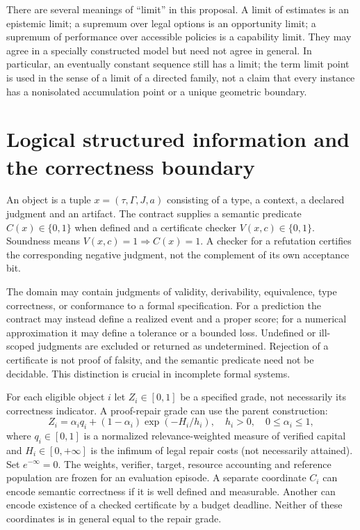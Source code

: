 \documentclass[11pt]{article}
\begin{document}
There are several meanings of ``limit'' in this proposal. A limit of estimates is an epistemic limit; a supremum over legal options is an opportunity limit; a supremum of performance over accessible policies is a capability limit. They may agree in a specially constructed model but need not agree in general. In particular, an eventually constant sequence still has a limit; the term limit point is used in the sense of a limit of a directed family, not a claim that every instance has a nonisolated accumulation point or a unique geometric boundary.

\section{Logical structured information and the correctness boundary}
\begin{definition}
An object is a tuple $x=(\tau,\Gamma,J,a)$ consisting of a type, a context, a declared judgment and an artifact. The contract supplies a semantic predicate $C(x)\in\{0,1\}$ when defined and a certificate checker $V(x,c)\in\{0,1\}$. Soundness means $V(x,c)=1\Rightarrow C(x)=1$. A checker for a refutation certifies the corresponding negative judgment, not the complement of its own acceptance bit.
\end{definition}
The domain may contain judgments of validity, derivability, equivalence, type correctness, or conformance to a formal specification. For a prediction the contract may instead define a realized event and a proper score; for a numerical approximation it may define a tolerance or a bounded loss. Undefined or ill-scoped judgments are excluded or returned as undetermined. Rejection of a certificate is not proof of falsity, and the semantic predicate need not be decidable. This distinction is crucial in incomplete formal systems.

For each eligible object $i$ let $Z_i\in[0,1]$ be a specified grade, not necessarily its correctness indicator. A proof-repair grade can use the parent construction:
\begin{equation} Z_i=\alpha_i q_i+(1-\alpha_i)\exp(-H_i/h_i),\quad h_i>0,\quad 0\leq\alpha_i\leq1,\end{equation}
where $q_i\in[0,1]$ is a normalized relevance-weighted measure of verified capital and $H_i\in[0,+\infty]$ is the infimum of legal repair costs (not necessarily attained). Set $e^{-\infty}=0$. The weights, verifier, target, resource accounting and reference population are frozen for an evaluation episode. A separate coordinate $C_i$ can encode semantic correctness if it is well defined and measurable. Another can encode existence of a checked certificate by a budget deadline. Neither of these coordinates is in general equal to the repair grade.
\end{document}
